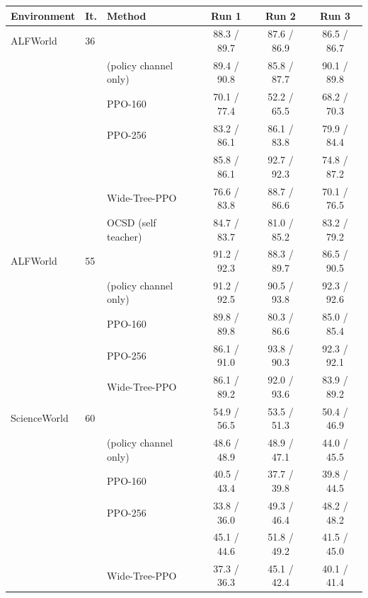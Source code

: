 \begin{tabular}{l l l c c c}
\toprule
Environment & It. & Method & Run 1 & Run 2 & Run 3 \\
\midrule
ALFWorld & 36 & \wmppo{} & 88.3 / 89.7 & 87.6 / 86.9 & 86.5 / 86.7 \\
 &  & \wmppo{} (policy channel only) & 89.4 / 90.8 & 85.8 / 87.7 & 90.1 / 89.8 \\
 &  & PPO-160 & 70.1 / 77.4 & 52.2 / 65.5 & 68.2 / 70.3 \\
 &  & PPO-256 & 83.2 / 86.1 & 86.1 / 83.8 & 79.9 / 84.4 \\
 &  & \qppo{} & 85.8 / 86.1 & 92.7 / 92.3 & 74.8 / 87.2 \\
 &  & Wide-Tree-PPO & 76.6 / 83.8 & 88.7 / 86.6 & 70.1 / 76.5 \\
 &  & OCSD (self teacher) & 84.7 / 83.7 & 81.0 / 85.2 & 83.2 / 79.2 \\
\midrule
ALFWorld & 55 & \wmppo{} & 91.2 / 92.3 & 88.3 / 89.7 & 86.5 / 90.5 \\
 &  & \wmppo{} (policy channel only) & 91.2 / 92.5 & 90.5 / 93.8 & 92.3 / 92.6 \\
 &  & PPO-160 & 89.8 / 89.8 & 80.3 / 86.6 & 85.0 / 85.4 \\
 &  & PPO-256 & 86.1 / 91.0 & 93.8 / 90.3 & 92.3 / 92.1 \\
 &  & Wide-Tree-PPO & 86.1 / 89.2 & 92.0 / 93.6 & 83.9 / 89.2 \\
\midrule
ScienceWorld & 60 & \wmppo{} & 54.9 / 56.5 & 53.5 / 51.3 & 50.4 / 46.9 \\
 &  & \wmppo{} (policy channel only) & 48.6 / 48.9 & 48.9 / 47.1 & 44.0 / 45.5 \\
 &  & PPO-160 & 40.5 / 43.4 & 37.7 / 39.8 & 39.8 / 44.5 \\
 &  & PPO-256 & 33.8 / 36.0 & 49.3 / 46.4 & 48.2 / 48.2 \\
 &  & \qppo{} & 45.1 / 44.6 & 51.8 / 49.2 & 41.5 / 45.0 \\
 &  & Wide-Tree-PPO & 37.3 / 36.3 & 45.1 / 42.4 & 40.1 / 41.4 \\
\bottomrule
\end{tabular}
